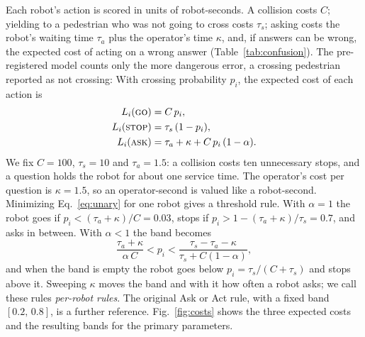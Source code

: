 \documentclass[a4paper,fleqn]{cas-dc}
\newcommand{\pgo}{\textsc{go}}
\newcommand{\pstop}{\textsc{stop}}
\newcommand{\pask}{\textsc{ask}}
\begin{document}
Each robot's action is scored in units of robot-seconds. A collision costs $C$; yielding to a pedestrian who was not going to cross costs $\tau_s$; asking costs the robot's waiting time $\tau_a$ plus the operator's time $\kappa$, and, if answers can be wrong, the expected cost of acting on a wrong answer (Table~\ref{tab:confusion}). The pre-registered model counts only the more dangerous error, a crossing pedestrian reported as not crossing: With crossing probability $p_i$, the expected cost of each action is
\begin{align}
L_i(\pgo) &= C\,p_i, \nonumber\\
L_i(\pstop) &= \tau_s\,(1-p_i), \label{eq:unary}\\
L_i(\pask) &= \tau_a + \kappa + C\,p_i\,(1-\alpha). \nonumber
\end{align}
We fix $C = 100$, $\tau_s = 10$ and $\tau_a = 1.5$: a collision costs ten unnecessary stops, and a question holds the robot for about one service time. The operator's cost per question is $\kappa = 1.5$, so an operator-second is valued like a robot-second. Minimizing Eq.~\eqref{eq:unary} for one robot gives a threshold rule. With $\alpha = 1$ the robot goes if $p_i < (\tau_a+\kappa)/C = 0.03$, stops if $p_i > 1 - (\tau_a+\kappa)/\tau_s = 0.7$, and asks in between. With $\alpha<1$ the band becomes
\begin{equation}
\frac{\tau_a+\kappa}{\alpha\,C} < p_i < \frac{\tau_s - \tau_a - \kappa}{\tau_s + C(1-\alpha)},
\label{eq:band}
\end{equation}
and when the band is empty the robot goes below $p_i = \tau_s/(C+\tau_s)$ and stops above it. Sweeping $\kappa$ moves the band and with it how often a robot asks; we call these rules \emph{per-robot rules}. The original Ask or Act rule, with a fixed band $[0.2,\,0.8]$, is a further reference. Fig.~\ref{fig:costs} shows the three expected costs and the resulting bands for the primary parameters.
\end{document}

